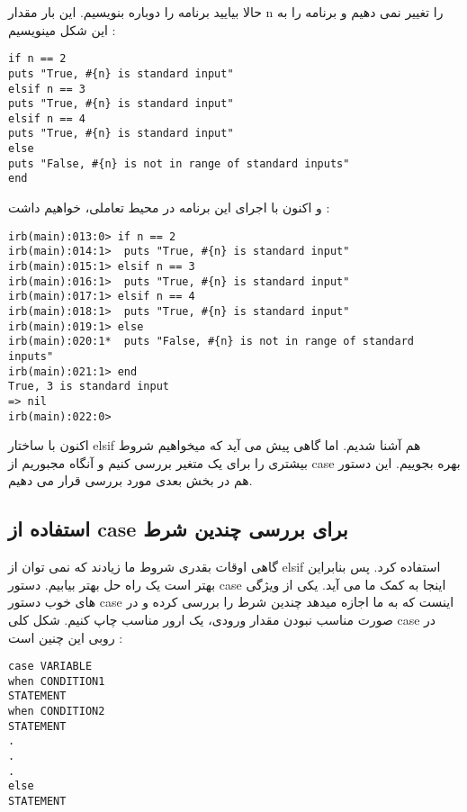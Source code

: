 \documentclass[11pt]{article}
\begin{document}
حالا بیایید برنامه را دوباره بنویسیم. این بار مقدار n را تغییر نمی دهیم و برنامه را به این شکل مینویسیم :
\begin{latin}
\begin{verbatim}
if n == 2
puts "True, #{n} is standard input"
elsif n == 3
puts "True, #{n} is standard input"
elsif n == 4
puts "True, #{n} is standard input"
else
puts "False, #{n} is not in range of standard inputs"
end
\end{verbatim}
\end{latin}
و اکنون با اجرای این برنامه در محیط تعاملی، خواهیم داشت :
\begin{latin}
\begin{verbatim}
irb(main):013:0> if n == 2
irb(main):014:1>  puts "True, #{n} is standard input"
irb(main):015:1> elsif n == 3
irb(main):016:1>  puts "True, #{n} is standard input"
irb(main):017:1> elsif n == 4
irb(main):018:1>  puts "True, #{n} is standard input"
irb(main):019:1> else
irb(main):020:1*  puts "False, #{n} is not in range of standard inputs"
irb(main):021:1> end
True, 3 is standard input
=> nil
irb(main):022:0>
\end{verbatim}
\end{latin}
اکنون با ساختار elsif هم آشنا شدیم. اما گاهی پیش می آید که میخواهیم شروط بیشتری را برای یک متغیر بررسی کنیم و آنگاه مجبوریم از case بهره بجوییم. این دستور هم در بخش بعدی مورد بررسی قرار می دهیم. 
\subsection{استفاده از case برای بررسی چندین شرط}
گاهی اوقات بقدری شروط ما زیادند که نمی توان از elsif استفاده کرد. پس بنابراین بهتر است یک راه حل بهتر بیابیم. دستور case اینجا به کمک ما می آید. یکی از ویژگی های خوب دستور case اینست که به ما اجازه میدهد چندین شرط را بررسی کرده و در صورت مناسب نبودن مقدار ورودی، یک ارور مناسب چاپ کنیم. شکل کلی case در روبی این چنین است :
\begin{latin}
\begin{verbatim}
case VARIABLE
when CONDITION1
STATEMENT
when CONDITION2
STATEMENT
.
.
.
else
STATEMENT
\end{verbatim}
\end{latin}
\end{document}
